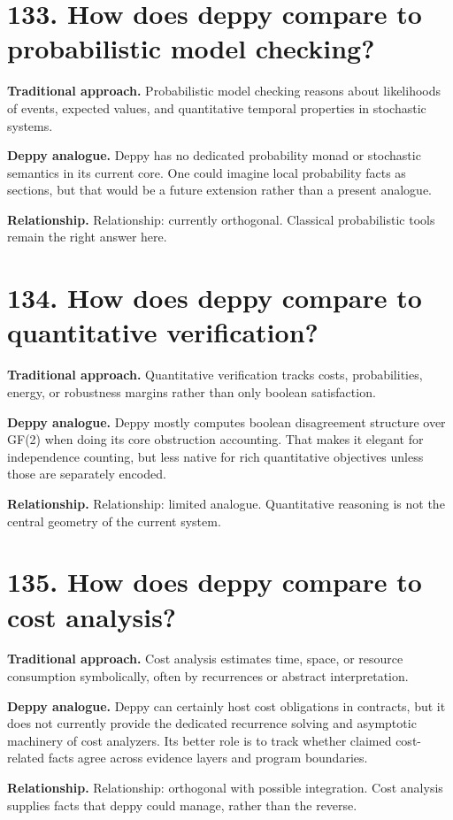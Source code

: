 \documentclass[11pt,openany]{book}
\begin{document}
\section*{133. How does deppy compare to probabilistic model checking?}
\textbf{Traditional approach.} Probabilistic model checking reasons about likelihoods of events, expected values, and quantitative temporal properties in stochastic systems.

\textbf{Deppy analogue.} Deppy has no dedicated probability monad or stochastic semantics in its current core. One could imagine local probability facts as sections, but that would be a future extension rather than a present analogue.

\textbf{Relationship.} Relationship: currently orthogonal. Classical probabilistic tools remain the right answer here.

\section*{134. How does deppy compare to quantitative verification?}
\textbf{Traditional approach.} Quantitative verification tracks costs, probabilities, energy, or robustness margins rather than only boolean satisfaction.

\textbf{Deppy analogue.} Deppy mostly computes boolean disagreement structure over GF(2) when doing its core obstruction accounting. That makes it elegant for independence counting, but less native for rich quantitative objectives unless those are separately encoded.

\textbf{Relationship.} Relationship: limited analogue. Quantitative reasoning is not the central geometry of the current system.

\section*{135. How does deppy compare to cost analysis?}
\textbf{Traditional approach.} Cost analysis estimates time, space, or resource consumption symbolically, often by recurrences or abstract interpretation.

\textbf{Deppy analogue.} Deppy can certainly host cost obligations in contracts, but it does not currently provide the dedicated recurrence solving and asymptotic machinery of cost analyzers. Its better role is to track whether claimed cost-related facts agree across evidence layers and program boundaries.

\textbf{Relationship.} Relationship: orthogonal with possible integration. Cost analysis supplies facts that deppy could manage, rather than the reverse.
\end{document}
